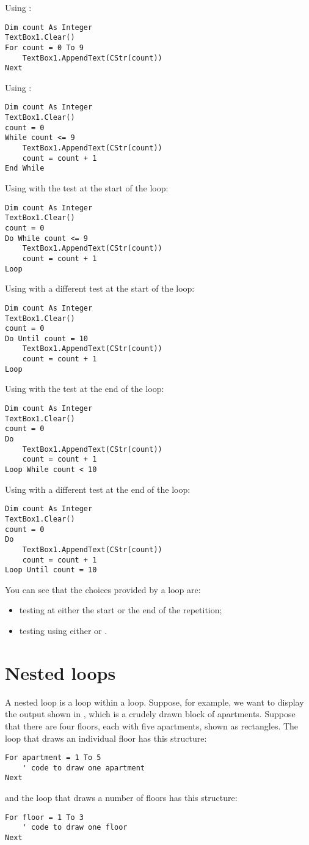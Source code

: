		Using :
		\begin{lstlisting}
Dim count As Integer
TextBox1.Clear()
For count = 0 To 9
	TextBox1.AppendText(CStr(count))
Next
		\end{lstlisting}
		Using :
		\begin{lstlisting}
Dim count As Integer
TextBox1.Clear()
count = 0
While count <= 9
	TextBox1.AppendText(CStr(count))
	count = count + 1
End While
		\end{lstlisting}
		Using  with the test at the start of the loop:
		\begin{lstlisting}
Dim count As Integer
TextBox1.Clear()
count = 0
Do While count <= 9
	TextBox1.AppendText(CStr(count))
	count = count + 1
Loop
		\end{lstlisting}
		Using  with a different test at the start of the loop:
		\begin{lstlisting}
Dim count As Integer
TextBox1.Clear()
count = 0
Do Until count = 10
	TextBox1.AppendText(CStr(count))
	count = count + 1
Loop
		\end{lstlisting}
		Using  with the test at the end of the loop:
		\begin{lstlisting}
Dim count As Integer
TextBox1.Clear()
count = 0
Do
	TextBox1.AppendText(CStr(count))
	count = count + 1
Loop While count < 10
		\end{lstlisting}
		Using  with a different test at the end of the loop:
		\begin{lstlisting}
Dim count As Integer
TextBox1.Clear()
count = 0
Do
	TextBox1.AppendText(CStr(count))
	count = count + 1
Loop Until count = 10
		\end{lstlisting}
		You can see that the choices provided by a  loop are:
		\begin{itemize}
	    \item testing at either the start or the end of the repetition;
  	  \item testing using either  or .
		\end{itemize}


	\section{Nested loops}
		A nested loop is a loop within a loop. Suppose, for example, we want to display the output shown in , which is a crudely drawn block of apartments. Suppose that there are four floors, each with five apartments, shown as rectangles. The loop that draws an individual floor has this structure:
		\begin{lstlisting}
For apartment = 1 To 5
	' code to draw one apartment
Next
		\end{lstlisting}
		and the loop that draws a number of floors has this structure:
		\begin{lstlisting}
For floor = 1 To 3
	' code to draw one floor
Next
		\end{lstlisting}

